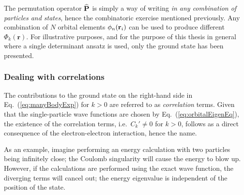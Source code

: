 
The permutation operator ${\bf\widehat{P}}$ is simply a way of writing \textit{in any combination of particles and states}, hence the combinatoric exercise mentioned previously. Any combination of $N$ orbital elements $\phi_n(\mathbf{r}_i)$ can be used to produce different $\Phi_k(\mathbf{r})$. For illustrative purposes, and for the purpose of this thesis in general where a single determinant ansatz is used, only the ground state has been presented.  

\subsubsection{Dealing with correlations}

The contributions to the ground state on the right-hand side in Eq.~(\ref{eq:manyBodyExp}) for $k>0$ are referred to as \textit{correlation} terms. Given that the single-particle wave functions are chosen by Eq.~(\ref{eq:orbitalEigenEq}), the existence of the correlation terms, i.e.~$C_k' \ne 0$ for $k>0$, follows as a direct consequence of the electron-electron interaction, hence the name.

As an example, imagine performing an energy calculation with two particles being infinitely close; the Coulomb singularity will cause the energy to blow up. However, if the calculations are performed using the exact wave function, the diverging terms will cancel out; the energy eigenvalue is independent of the position of the state. 

